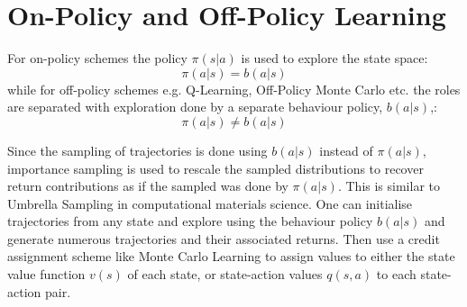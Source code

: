 \documentclass[a4paper,11pt]{article}
\begin{document}
\section{On-Policy and Off-Policy Learning}

For on-policy schemes the policy $\pi(s|a)$ is used to explore the state space:
\begin{equation} \label{eqn:on-policy-definition}
    \pi(a|s) = b(a|s)
\end{equation}
while for off-policy schemes e.g. Q-Learning, Off-Policy Monte Carlo etc. the roles are separated with exploration done by a separate behaviour policy, $b(a|s)$,:
\begin{equation} \label{eqn:off-policy-definition}
    \pi(a|s) \neq b(a|s)
\end{equation}

Since the sampling of trajectories is done using $b(a|s)$ instead of $\pi(a|s)$, importance sampling is used to rescale the sampled distributions to recover return contributions as if the sampled was done by $\pi(a|s)$.  This is similar to Umbrella Sampling in computational materials science.  One can initialise trajectories from any state and explore using the behaviour policy $b(a|s)$ and generate numerous trajectories and their associated returns.  Then use a credit assignment scheme like Monte Carlo Learning to assign values to either the state value function $v(s)$ of each state, or state-action values $q(s,a)$ to each state-action pair.
\end{document}
